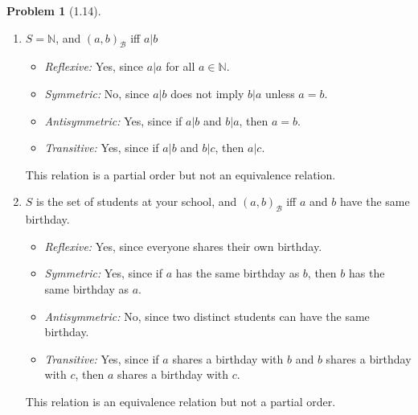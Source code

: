 \documentclass[12pt]{article}
\theoremstyle{definition}
\newtheorem{problem}{Problem}
\begin{document}
\begin{problem}[1.14]
\begin{enumerate}[label=(\alph*)]
        \item $S = \mathbb{N}$, and $(a, b)_\mathcal{B}$ iff $a|b$
        \begin{solution}
            \begin{itemize}
                \item \textit{Reflexive:} Yes, since $a | a$ for all $a \in \mathbb{N}$.
                \item \textit{Symmetric:} No, since $a | b$ does not imply $b | a$ unless $a = b$.
                \item \textit{Antisymmetric:} Yes, since if $a | b$ and $b | a$, then $a = b$.
                \item \textit{Transitive:} Yes, since if $a | b$ and $b | c$, then $a | c$.
            \end{itemize}
            This relation is a partial order but not an equivalence relation.
        \end{solution}
        
        \item $S$ is the set of students at your school, and $(a, b)_\mathcal{B}$ iff $a$ and $b$ have the same birthday.
        \begin{solution}
            \begin{itemize}
                \item \textit{Reflexive:} Yes, since everyone shares their own birthday.
                \item \textit{Symmetric:} Yes, since if $a$ has the same birthday as $b$, then $b$ has the same birthday as $a$.
                \item \textit{Antisymmetric:} No, since two distinct students can have the same birthday.
                \item \textit{Transitive:} Yes, since if $a$ shares a birthday with $b$ and $b$ shares a birthday with $c$, then $a$ shares a birthday with $c$.
            \end{itemize}
            This relation is an equivalence relation but not a partial order.
        \end{solution}
        

\end{enumerate}
\end{problem}
\end{document}
